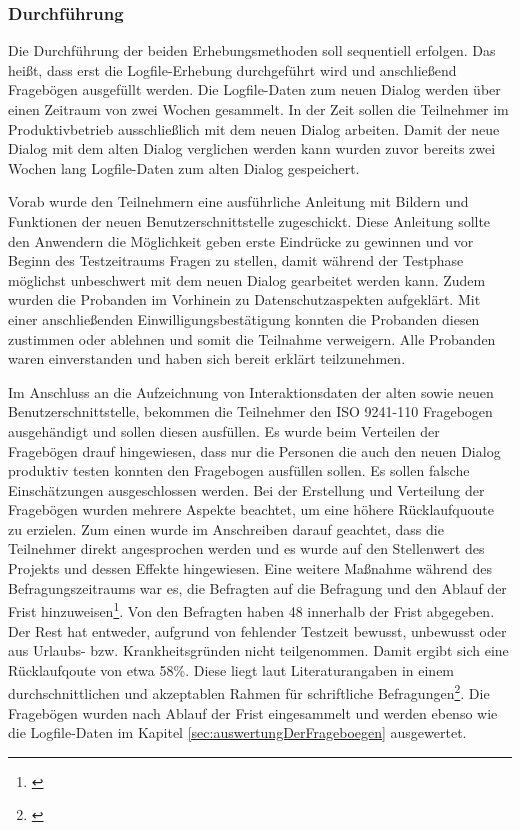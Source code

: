 \subsubsection{Durchführung}
\label{sec:durchfuehrungEvaluation}
Die Durchführung der beiden Erhebungsmethoden soll sequentiell erfolgen. Das heißt, dass erst die Logfile-Erhebung durchgeführt wird und anschließend Fragebögen ausgefüllt werden. Die Logfile-Daten zum neuen Dialog werden über einen Zeitraum von zwei Wochen gesammelt. In der Zeit sollen die Teilnehmer im Produktivbetrieb ausschließlich mit dem neuen Dialog arbeiten. Damit der neue Dialog mit dem alten Dialog verglichen werden kann wurden zuvor bereits zwei Wochen lang Logfile-Daten zum alten Dialog gespeichert. 

Vorab wurde den Teilnehmern eine ausführliche Anleitung mit Bildern und Funktionen der neuen Benutzerschnittstelle zugeschickt. Diese Anleitung sollte den Anwendern die Möglichkeit geben erste Eindrücke zu gewinnen und vor Beginn des Testzeitraums Fragen zu stellen, damit während der Testphase möglichst unbeschwert mit dem neuen Dialog gearbeitet werden kann. Zudem wurden die Probanden im Vorhinein zu Datenschutzaspekten aufgeklärt. Mit einer anschließenden Einwilligungsbestätigung konnten die Probanden diesen zustimmen oder ablehnen und somit die Teilnahme verweigern. Alle Probanden waren einverstanden und haben sich bereit erklärt teilzunehmen.

Im Anschluss an die Aufzeichnung von Interaktionsdaten der alten sowie neuen Benutzerschnittstelle, bekommen die Teilnehmer den ISO 9241-110 Fragebogen ausgehändigt und sollen diesen ausfüllen. Es wurde beim Verteilen der Fragebögen drauf hingewiesen, dass nur die Personen die auch den neuen Dialog produktiv testen konnten den Fragebogen ausfüllen sollen. Es sollen falsche Einschätzungen ausgeschlossen werden. Bei der Erstellung und Verteilung der Fragebögen wurden mehrere Aspekte beachtet, um eine höhere Rücklaufquoute zu erzielen. Zum einen wurde im Anschreiben darauf geachtet, dass die Teilnehmer direkt angesprochen werden und es wurde auf den Stellenwert des Projekts und dessen Effekte hingewiesen. Eine weitere Maßnahme während des Befragungszeitraums war es, die Befragten auf die Befragung und den Ablauf der Frist hinzuweisen\footnote{\cite[vgl.][58]{Petermann2005}}. Von den Befragten haben 48 innerhalb der Frist abgegeben. Der Rest hat entweder, aufgrund von fehlender Testzeit bewusst, unbewusst oder aus Urlaubs- bzw. Krankheitsgründen nicht teilgenommen. Damit ergibt sich eine Rücklaufqoute von etwa 58\%. Diese liegt laut Literaturangaben in einem durchschnittlichen und akzeptablen Rahmen für schriftliche Befragungen\footnote{\cite[vgl.][58]{Petermann2005}}. Die Fragebögen wurden nach Ablauf der Frist eingesammelt und werden ebenso wie die Logfile-Daten im Kapitel \ref{sec:auswertungDerFrageboegen} ausgewertet.
